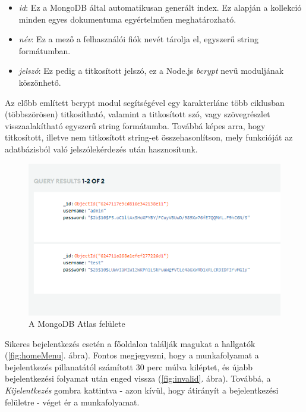 \begin{itemize}
\item{\textit{id}}: Ez a MongoDB által automatikusan generált index. Ez alapján a kollekció minden egyes dokumentuma egyértelműen meghatározható.
\item{\textit{név}}: Ez a mező a felhasználói fiók nevét tárolja el, egyszerű string formátumban.
\item{\textit{jelszó}}: Ez pedig a titkosított jelszó, ez a Node.js \textit{bcrypt} nevű moduljának köszönhető.
\end{itemize}

Az előbb említett bcrypt modul segítségével egy karakterlánc több ciklusban (többszörösen) titkosítható, valamint a titkosított szó, vagy szövegrészlet visszaalakítható egyszerű string formátumba. Továbbá képes arra, hogy titkosított, illetve nem titkosított string-et összehasonlítson, mely funkcióját az adatbázisból való jelszólekérdezés után hasznosítunk.

\begin{figure}[h]
	\centering
		\includegraphics[width=12truecm, height=7truecm]{images/atlas.png}
	\caption{A MongoDB Atlas felülete}
	\label{fig:atlas}
\end{figure}

Sikeres bejelentkezés esetén a főoldalon találják magukat a hallgatók (\ref{fig:homeMenu}. ábra). Fontos megjegyezni, hogy a munkafolyamat a bejelentkezés pillanatától számított 30 perc múlva kiléptet, és újabb bejelentkezési folyamat után enged vissza (\ref{fig:invalid}. ábra). Továbbá, a \textit{Kijelentkezés} gombra kattintva - azon kívül, hogy átirányít a bejelentkezési felületre - véget ér a munkafolyamat.

